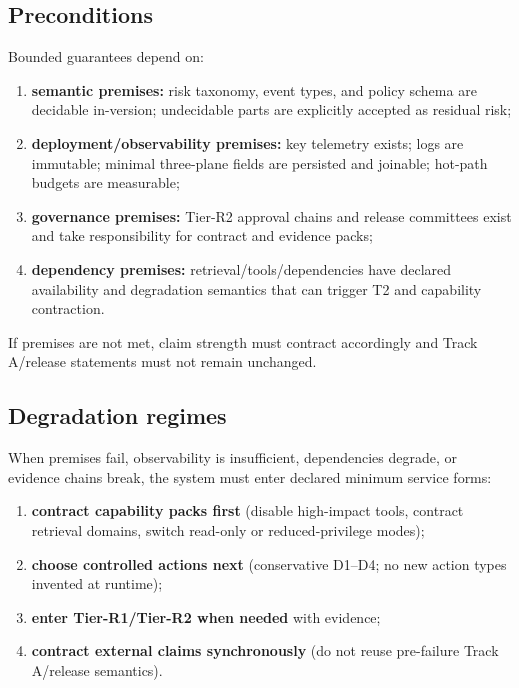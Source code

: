 \documentclass[11pt,a4paper]{report}
\begin{document}
\subsection{Preconditions}
Bounded guarantees depend on:
\begin{enumerate}
  \item \textbf{semantic premises:} risk taxonomy, event types, and policy schema are decidable in-version; undecidable parts are explicitly accepted as residual risk;
  \item \textbf{deployment/observability premises:} key telemetry exists; logs are immutable; minimal three-plane fields are persisted and joinable; hot-path budgets are measurable;
  \item \textbf{governance premises:} Tier-R2 approval chains and release committees exist and take responsibility for contract and evidence packs;
  \item \textbf{dependency premises:} retrieval/tools/dependencies have declared availability and degradation semantics that can trigger T2 and capability contraction.
\end{enumerate}
\noindent If premises are not met, claim strength must contract accordingly and Track A/release statements must not remain unchanged.

\subsection{Degradation regimes}
When premises fail, observability is insufficient, dependencies degrade, or evidence chains break, the system must enter declared minimum service forms:
\begin{enumerate}
  \item \textbf{contract capability packs first} (disable high-impact tools, contract retrieval domains, switch read-only or reduced-privilege modes);
  \item \textbf{choose controlled actions next} (conservative D1--D4; no new action types invented at runtime);
  \item \textbf{enter Tier-R1/Tier-R2 when needed} with evidence;
  \item \textbf{contract external claims synchronously} (do not reuse pre-failure Track A/release semantics).
\end{enumerate}
\end{document}
